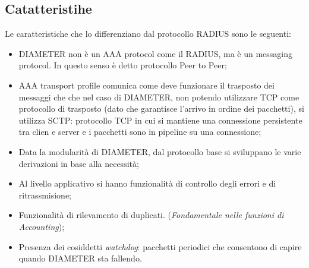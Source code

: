 \documentclass{article}
\theoremstyle{remark}
\begin{document}
\subsection{Catatteristihe}
Le caratteristiche che lo differenziano dal protocollo RADIUS sono le seguenti:\begin{itemize}
    \item DIAMETER non è un AAA protocol come il RADIUS, ma è un messaging protocol. In questo senso è detto protocollo Peer to Peer;
    \item AAA transport profile comunica come deve funzionare il trasposto dei messaggi che che nel caso di DIAMETER, non potendo utilizzare TCP come protocollo di trasposto (dato che garantisce l'arrivo in ordine dei pacchetti), si utilizza SCTP: protocollo TCP in cui si mantiene una connessione persistente tra clien e server e i pacchetti sono in pipeline su una connessione;
    \item Data la modularità di DIAMETER, dal protocollo base si sviluppano le varie derivazioni in base alla necessità;
    \item Al livello applicativo si hanno funzionalità di controllo degli errori e di ritrassmisione;
    \item Funzionalità di rilevamento di duplicati. (\emph{Fondamentale nelle funzioni di Accounting});
    \item Presenza dei cosiddetti \emph{watchdog}: pacchetti periodici che consentono di capire quando DIAMETER sta fallendo.
\end{itemize}
\end{document}
